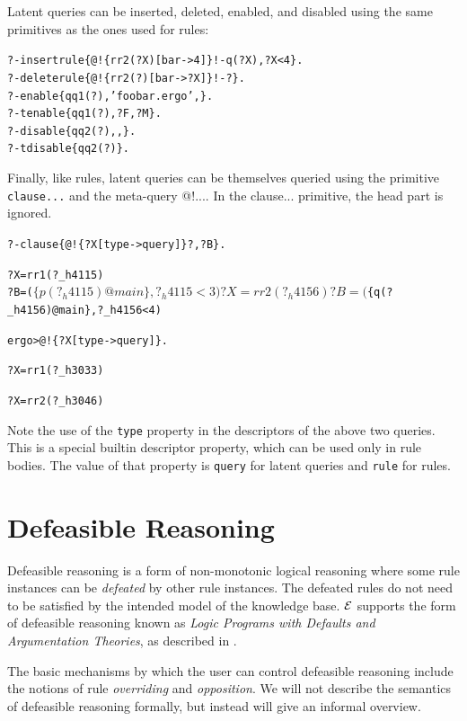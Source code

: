 \documentclass[11pt]{article}
\newcommand{\ERGO}{\mbox{\ensuremath{\cal{E}}\smaller{{\sc{RGO}}}}\xspace}
\newcommand{\FLSYSTEM}{\ERGO}
\newcommand{\prompt}{ergo> }
\newcommand{\ergoext}{ergo\xspace}
\begin{document}
Latent queries can be inserted, deleted, enabled, and disabled using the
same primitives as the ones used for rules:
\begin{alltt}
 ?- insertrule\{@!\{rr2(?X)[bar->4]\} !- q(?X), ?X<4\}.
 ?- deleterule\{@!\{rr2(?)[bar->?X]\} !- ?\}.
 ?- enable\{qq1(?),'foobar.\ergoext',\@\}.
 ?- tenable\{qq1(?),?F,?M\}.
 ?- disable\{qq2(?),\@F,\@\}.
 ?- tdisable\{qq2(?)\}.
\end{alltt}

Finally, like rules, latent queries can be themselves queried using the
primitive \texttt{clause{...}}  and the meta-query @!{...}. In the
clause{...} primitive, the head part is ignored.
\begin{alltt}
  ?- clause\{@!\{?X[type->query]\} ?,?B\}.

  ?X = rr1(?_h4115)
  ?B = ($\{p(?_h4115)@main\}, ?_h4115 < 3)

  ?X = rr2(?_h4156)
  ?B = ($\{q(?_h4156)@main\}, ?_h4156 < 4)

  \prompt @!\{?X[type->query]\}.

  ?X = rr1(?_h3033)

  ?X = rr2(?_h3046)
\end{alltt}
Note the use of the \texttt{type} property in the descriptors of the above
two queries. This is a special builtin descriptor property, which can be
used only in rule bodies. The value of that property is \texttt{query} for
latent queries and \texttt{rule} for rules.  





\section{Defeasible Reasoning}
\label{sec-defeasible}

Defeasible reasoning is a form of non-monotonic logical reasoning where
some rule instances can be \emph{defeated} by other rule instances. The
defeated rules do not need to be satisfied by the intended model of the
knowledge base. \FLSYSTEM supports the form of defeasible reasoning known as
\emph{Logic Programs with Defaults and Argumentation Theories}, as
described in \cite{lpda-iclp-09}.  

The basic mechanisms by which the user can control defeasible
reasoning include the notions of rule \emph{overriding} and 
\emph{opposition}.  We will not describe the semantics of defeasible
reasoning formally, but instead will give an informal overview.
\end{document}
